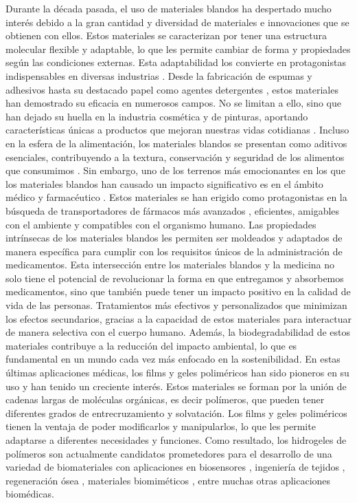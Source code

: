 Durante la d\'ecada pasada, el uso de materiales blandos ha despertado mucho inter\'es debido a la gran cantidad y diversidad de materiales e innovaciones que se obtienen con ellos. Estos materiales se caracterizan por tener una estructura molecular flexible y adaptable, lo que les permite cambiar de forma y propiedades seg\'un las condiciones externas. Esta adaptabilidad los convierte en protagonistas indispensables en diversas industrias \cite{zhu2022review}. Desde la fabricaci\'on de espumas y adhesivos \cite{wu2021review} hasta su destacado papel como agentes detergentes \cite{chowdhury2019novel}, estos materiales han demostrado su eficacia en numerosos campos. No se limitan a ello, sino que han dejado su huella en la industria cosm\'etica y de pinturas, aportando caracter\'isticas \'unicas a productos que mejoran nuestras vidas cotidianas \cite{hirst2019fundamentals}. Incluso en la esfera de la alimentaci\'on, los materiales blandos se presentan como aditivos esenciales, contribuyendo a la textura, conservaci\'on y seguridad de los alimentos que consumimos \cite{kwok2019microgel}.
Sin embargo, uno de los terrenos m\'as emocionantes en los que los materiales blandos han causado un impacto significativo es en el \'ambito m\'edico y farmac\'eutico \cite{rasool2019stimuli}. Estos materiales se han erigido como protagonistas en la b\'usqueda de transportadores de f\'armacos m\'as avanzados \cite{mcclements2017designing,annabi201425th}, eficientes, amigables con el ambiente y compatibles con el organismo humano. Las propiedades intr\'insecas de los materiales blandos les permiten ser moldeados y adaptados de manera espec\'ifica para cumplir con los requisitos \'unicos de la administraci\'on de medicamentos.
Esta intersecci\'on entre los materiales blandos y la medicina no solo tiene el potencial de revolucionar la forma en que entregamos y absorbemos medicamentos, sino que tambi\'en puede tener un impacto positivo en la calidad de vida de las personas. Tratamientos m\'as efectivos y personalizados que minimizan los efectos secundarios, gracias a la capacidad de estos materiales para interactuar de manera selectiva con el cuerpo humano. Adem\'as, la biodegradabilidad de estos materiales contribuye a la reducci\'on del impacto ambiental, lo que es fundamental en un mundo cada vez m\'as enfocado en la sostenibilidad.
En estas \'ultimas aplicaciones m\'edicas, los films y geles polim\'ericos han sido pioneros en su uso y han tenido un creciente inter\'es. Estos materiales se forman por la uni\'on de cadenas largas de mol\'eculas org\'anicas, es decir pol\'imeros, que pueden tener diferentes grados de entrecruzamiento y solvataci\'on. Los films y geles polim\'ericos tienen la ventaja de poder modificarlos y manipularlos, lo que les permite adaptarse a diferentes necesidades y funciones.
Como resultado, los hidrogeles de pol\'imeros son actualmente candidatos prometedores para el desarrollo de una variedad de biomateriales con aplicaciones en biosensores \cite{zhang2012ultrathin,islam2014responsive}, ingenier\'ia de tejidos \cite{matricardi2013interpenetrating,van2011biopolymer}, regeneraci\'on \'osea \cite{bai2018bioactive}, materiales biomim\'eticos \cite{green2016mimicking,wu2010multifunctional}, entre muchas otras aplicaciones biom\'edicas.

